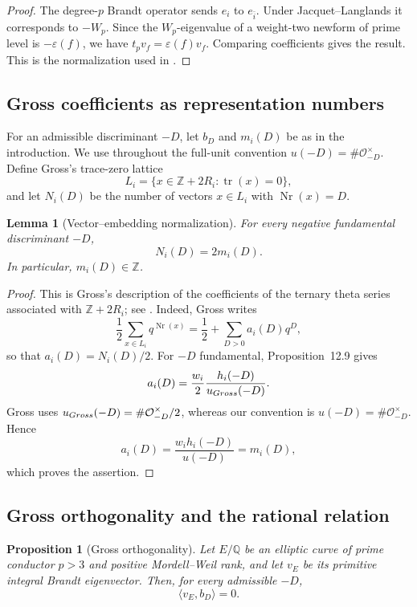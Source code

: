 \documentclass[10pt,a4paper]{amsart}
\newtheorem{proposition}[theorem]{Proposition}
\newtheorem{lemma}[theorem]{Lemma}
\newcommand{\Q}{\mathbb{Q}}
\newcommand{\Z}{\mathbb{Z}}
\newcommand{\OO}{\mathcal{O}}
\newcommand{\tr}{\operatorname{tr}}
\newcommand{\Nr}{\operatorname{Nr}}
\begin{document}
\begin{proof}
The degree-$p$ Brandt operator sends $e_i$ to $e_{\bar i}$.  Under Jacquet--Langlands it corresponds to $-W_p$.  Since the $W_p$-eigenvalue of a weight-two newform of prime level is $-\varepsilon(f)$, we have $t_pv_f=\varepsilon(f)v_f$.  Comparing coefficients gives the result.  This is the normalization used in \cite[Propositions~18--19]{KazalickiKohen2017}.
\end{proof}

\subsection{Gross coefficients as representation numbers}

For an admissible discriminant $-D$, let $b_D$ and $m_i(D)$ be as in the introduction.  We use throughout the full-unit convention $u(-D)=\#\OO_{-D}^{\times}$.  Define Gross's trace-zero lattice
\[
  L_i=\{x\in\Z+2R_i:\tr(x)=0\},
\]
and let $N_i(D)$ be the number of vectors $x\in L_i$ with $\Nr(x)=D$.

\begin{lemma}[Vector--embedding normalization]\label{lem:normalization}
For every negative fundamental discriminant $-D$,
\[
  N_i(D)=2m_i(D).
\]
In particular, $m_i(D)\in\Z$.
\end{lemma}

\begin{proof}
This is Gross's description of the coefficients of the ternary theta
series associated with $\Z+2R_i$; see
\cite[(12.7)--(12.8) and Proposition~12.9]{Gross1987}.
Indeed, Gross writes
\[
  \frac12\sum_{x\in L_i}q^{\Nr(x)}
  =\frac12+\sum_{D>0}a_i(D)q^D,
\]
so that $a_i(D)=N_i(D)/2$.  For $-D$ fundamental,
Proposition~12.9 gives
\[
  a_i(D)=\frac{w_i}{2}\frac{h_i(-D)}{u_{\rm Gross}(-D)}.
\]
Gross uses $u_{\rm Gross}(-D)=\#\OO_{-D}^{\times}/2$, whereas our
convention is $u(-D)=\#\OO_{-D}^{\times}$. Hence
\[
  a_i(D)=\frac{w_i h_i(-D)}{u(-D)}=m_i(D),
\]
which proves the assertion.
\end{proof}

\subsection{Gross orthogonality and the rational relation}

\begin{proposition}[Gross orthogonality]\label{prop:gross-orthogonality}
Let $E/\Q$ be an elliptic curve of prime conductor $p>3$ and positive Mordell--Weil rank, and let $v_E$ be its primitive integral Brandt eigenvector.  Then, for every admissible $-D$,
\[
  \langle v_E,b_D\rangle=0.
\]
\end{proposition}
\end{document}
